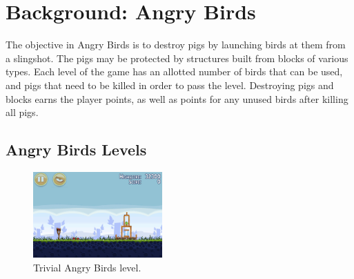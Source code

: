 \section{Background: Angry Birds}
The objective in Angry Birds is to destroy pigs by launching birds at them from a slingshot. The pigs may be protected by structures built from blocks of various types. Each level of the game has an allotted number of birds that can be used, and pigs that need to be killed in order to pass the level. Destroying pigs and blocks earns the player points, as well as points for any unused birds after killing all pigs. 



\subsection{Angry Birds Levels}

\begin{figure}
\begin{center}
\includegraphics[trim = 0 100 0 150, clip, width=0.44\textwidth]{images/level.PNG}
\end{center}
\caption{Trivial Angry Birds level.}
\label{fig:easy-level}
\end{figure}

